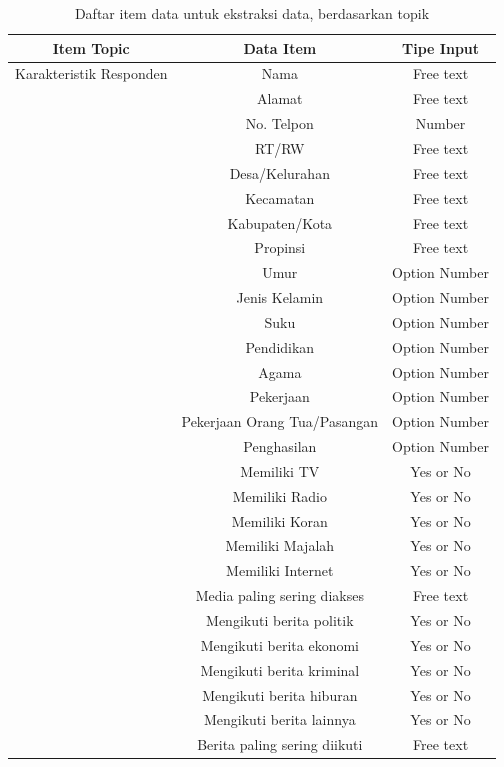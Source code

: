 \documentclass[letterpaper, 10 pt, conference]{ieeeconf}  %
\begin{document}
\begin{table}[h]
\caption{Daftar item data untuk ekstraksi data, berdasarkan topik}
\label{table_example}
\begin{center}
\begin{tabular}{|c||c||c|}
\hline
Item Topic & Data Item & Tipe Input\\
\hline
Karakteristik Responden & Nama & Free text\\
\hline
 & Alamat & Free text\\
\hline
 & No. Telpon & Number\\
\hline
 & RT/RW & Free text\\
\hline
 & Desa/Kelurahan & Free text\\
\hline
 & Kecamatan & Free text\\
\hline
 & Kabupaten/Kota & Free text\\
\hline
 & Propinsi & Free text\\
\hline
& Umur & Option Number\\
\hline
& Jenis Kelamin & Option Number\\
\hline
& Suku & Option Number\\
\hline
& Pendidikan & Option Number\\
\hline
& Agama & Option Number\\
\hline
& Pekerjaan & Option Number\\
\hline
& Pekerjaan Orang Tua/Pasangan & Option Number\\
\hline
& Penghasilan & Option Number\\
\hline
& Memiliki TV & Yes or No\\
\hline
& Memiliki Radio & Yes or No\\
\hline
& Memiliki Koran & Yes or No\\
\hline
& Memiliki Majalah & Yes or No\\
\hline
& Memiliki Internet & Yes or No\\
\hline
& Media paling sering diakses & Free text\\
\hline
& Mengikuti berita politik & Yes or No\\
\hline
& Mengikuti berita ekonomi & Yes or No\\
\hline
& Mengikuti berita kriminal & Yes or No\\
\hline
& Mengikuti berita hiburan & Yes or No\\
\hline
& Mengikuti berita lainnya & Yes or No\\
\hline
& Berita paling sering diikuti & Free text\\

\end{tabular}
\end{center}
\end{table}
\end{document}
